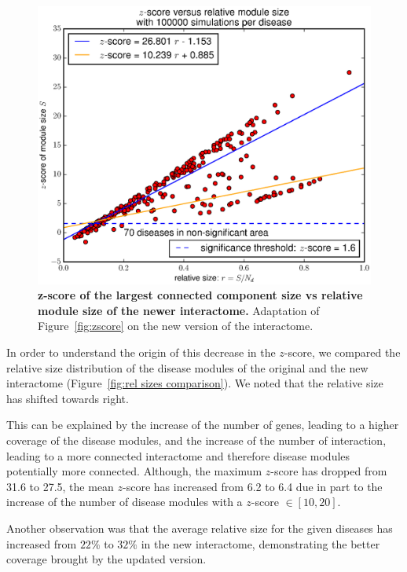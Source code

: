 \documentclass[letterpaper]{article}
\begin{document}
	\begin{figure}[!h]
		\centering
		\includegraphics[width=.5\textwidth]{images/new_interactome_S4.b100000.eps}
		\vspace{-.7cm}
		\caption{{\bf z-score of the largest connected component size vs relative module size of the newer interactome.}
		Adaptation of Figure~\ref{fig:zscore} on the new version of the interactome.
		\label{fig:new interactome zscore}}
		\vspace{-.5cm}
	\end{figure}

	In order to understand the origin of this decrease in the $z$-score, we compared the relative size
	distribution of the disease modules of the original and the new interactome
	(Figure~\ref{fig:rel sizes comparison}). We noted that the relative size has shifted towards right.

	This can be explained by the increase of the number of genes, leading to a higher coverage of the disease
	modules, and the increase of the number of interaction, leading to a more connected interactome and
	therefore disease modules potentially more connected. Although, the maximum $z$-score has dropped from
	31.6 to 27.5, the mean $z$-score has increased from 6.2 to 6.4 due in part to the increase of the number
	of disease modules with a $z$-score $\in [10, 20]$.

	Another observation was that the average relative size for the given diseases has increased from $22\%$
	to $32\%$ in the new interactome, demonstrating the better coverage brought by the updated version.
\end{document}
